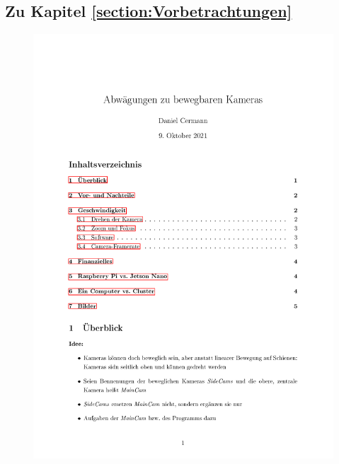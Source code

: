 \documentclass[11pt,a4paper]{article}
\begin{document}
\subsection{Zu Kapitel \autoref{section:Vorbetrachtungen}}
\begin{figure}[H]
    \centering
    \includegraphics[page=1, scale=.3]{images/TPZ_Cameras_Idea.pdf}

\end{figure}
\end{document}
